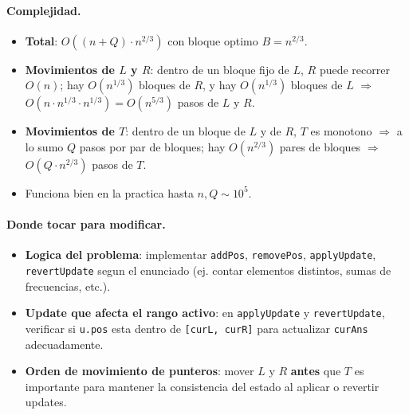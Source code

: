 \paragraph{Complejidad.}
\begin{itemize}\setlength\itemsep{0pt}
	\item \textbf{Total}: $O((n + Q) \cdot n^{2/3})$ con bloque optimo $B = n^{2/3}$.
	\item \textbf{Movimientos de $L$ y $R$}: dentro de un bloque fijo de $L$, $R$ puede recorrer $O(n)$; hay $O(n^{1/3})$ bloques de $R$, y hay $O(n^{1/3})$ bloques de $L$ $\Rightarrow$ $O(n \cdot n^{1/3} \cdot n^{1/3}) = O(n^{5/3})$ pasos de $L$ y $R$.
	\item \textbf{Movimientos de $T$}: dentro de un bloque de $L$ y de $R$, $T$ es monotono $\Rightarrow$ a lo sumo $Q$ pasos por par de bloques; hay $O(n^{2/3})$ pares de bloques $\Rightarrow$ $O(Q \cdot n^{2/3})$ pasos de $T$.
	\item Funciona bien en la practica hasta $n, Q \sim 10^5$.
\end{itemize}

\paragraph{Donde tocar para modificar.}
\begin{itemize}\setlength\itemsep{0pt}
	\item \textbf{Logica del problema}: implementar \verb|addPos|, \verb|removePos|, \verb|applyUpdate|, \verb|revertUpdate| segun el enunciado (ej. contar elementos distintos, sumas de frecuencias, etc.).
	\item \textbf{Update que afecta el rango activo}: en \verb|applyUpdate| y \verb|revertUpdate|, verificar si \verb|u.pos| esta dentro de \verb|[curL, curR]| para actualizar \verb|curAns| adecuadamente.
	\item \textbf{Orden de movimiento de punteros}: mover $L$ y $R$ \textbf{antes} que $T$ es importante para mantener la consistencia del estado al aplicar o revertir updates.
\end{itemize}

